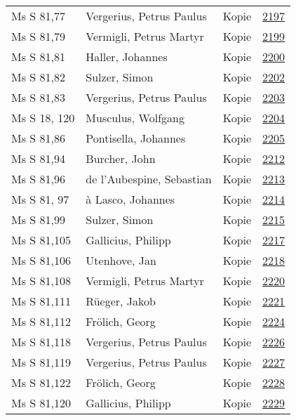 \documentclass[10pt,a4paper,landscape]{report}
\begin{document}
\begin{longtable}{p{16cm}p{4cm}lr}
Ms S 81,77	&	Vergerius, Petrus Paulus	&	Kopie	&	\href{http://130.60.24.72/assignment/2197}{2197}\\
Ms S 81,79	&	Vermigli, Petrus Martyr	&	Kopie	&	\href{http://130.60.24.72/assignment/2199}{2199}\\
Ms S 81,81	&	Haller, Johannes	&	Kopie	&	\href{http://130.60.24.72/assignment/2200}{2200}\\
Ms S 81,82	&	Sulzer, Simon	&	Kopie	&	\href{http://130.60.24.72/assignment/2202}{2202}\\
Ms S 81,83	&	Vergerius, Petrus Paulus	&	Kopie	&	\href{http://130.60.24.72/assignment/2203}{2203}\\
Ms S 18, 120	&	Musculus, Wolfgang	&	Kopie	&	\href{http://130.60.24.72/assignment/2204}{2204}\\
Ms S 81,86	&	Pontisella, Johannes	&	Kopie	&	\href{http://130.60.24.72/assignment/2205}{2205}\\
Ms S 81,94	&	Burcher, John	&	Kopie	&	\href{http://130.60.24.72/assignment/2212}{2212}\\
Ms S 81,96	&	de l'Aubespine, Sebastian	&	Kopie	&	\href{http://130.60.24.72/assignment/2213}{2213}\\
Ms S 81, 97	&	à Lasco, Johannes	&	Kopie	&	\href{http://130.60.24.72/assignment/2214}{2214}\\
Ms S 81,99	&	Sulzer, Simon	&	Kopie	&	\href{http://130.60.24.72/assignment/2215}{2215}\\
Ms S 81,105	&	Gallicius, Philipp	&	Kopie	&	\href{http://130.60.24.72/assignment/2217}{2217}\\
Ms S 81,106	&	Utenhove, Jan	&	Kopie	&	\href{http://130.60.24.72/assignment/2218}{2218}\\
Ms S 81,108	&	Vermigli, Petrus Martyr	&	Kopie	&	\href{http://130.60.24.72/assignment/2220}{2220}\\
Ms S 81,111	&	Rüeger, Jakob	&	Kopie	&	\href{http://130.60.24.72/assignment/2221}{2221}\\
Ms S 81,112	&	Frölich, Georg	&	Kopie	&	\href{http://130.60.24.72/assignment/2224}{2224}\\
Ms S 81,118	&	Vergerius, Petrus Paulus	&	Kopie	&	\href{http://130.60.24.72/assignment/2226}{2226}\\
Ms S 81,119	&	Vergerius, Petrus Paulus	&	Kopie	&	\href{http://130.60.24.72/assignment/2227}{2227}\\
Ms S 81,122	&	Frölich, Georg	&	Kopie	&	\href{http://130.60.24.72/assignment/2228}{2228}\\
Ms S 81,120	&	Gallicius, Philipp	&	Kopie	&	\href{http://130.60.24.72/assignment/2229}{2229}\\

\end{longtable}
\end{document}
